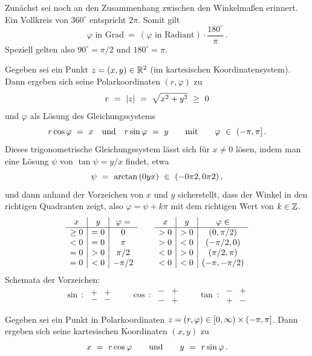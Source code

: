Zunächst sei noch an den Zusammenhang zwischen den Winkelmaßen erinnert. Ein
Vollkreis von $360^\circ$ entspricht $2\pi$. Somit gilt
\[
\text{$\varphi$ in Grad}
\ =\ (\text{$\varphi$ in Radiant})\cdot\frac{180^\circ}{\pi}
\,.
\]
Speziell gelten also $90^\circ=\pi/2$ und $180^\circ=\pi$.

\noindent Gegeben sei ein Punkt $z=(x,y)\in\mathbb{R}^2$ (im kartesischen Koordinatensystem). Dann ergeben sich seine Polarkoordinaten $(r,\varphi)$ zu
\[
r
\ =\ \lvert z\rvert
\ =\ \sqrt{x^2+y^2}
\ \ge\ 0
\]
und $\varphi$ als Lösung des Gleichungssystems
\[
r\cos\varphi
\ =\ x
\quad\text{und}\quad
r\sin\varphi
\ =\ y
\qquad\text{mit}\qquad
\varphi
\ \in\ ({-\pi},{\pi}]
\,.
\]
Dieses trigonometrische Gleichungssystem lässt sich für $x\neq0$ lösen, indem
man eine Lösung $\psi$ von $\tan\psi=y/x$ findet, etwa
\[
\psi
\ =\ \arctan\left(\frac{y}{x}\right)
\ \in\ \Ointerval{-\frac{\pi}2}{\frac{\pi}2}
,
\]
und dann anhand der Vorzeichen von $x$ und $y$ sicherstellt, dass der Winkel in den richtigen Quadranten zeigt, also $\varphi=\psi+k\pi$ mit dem richtigen Wert von $k\in\mathbb{Z}$.
\[
\begin{array}{c|c|c}
x & y & \varphi=\\
\hline
\ge0 & =0 & 0\\
<0 & =0 & \pi\\
=0 & >0 & \pi/2\\
=0 & <0 & -\pi/2
\end{array}
\qquad
\begin{array}{c|c|c}
x & y & \varphi\in\\
\hline
>0 & >0 & ({0},{\pi/2})\\
>0 & <0 & ({-\pi/2},{0})\\
<0 & >0 & ({\pi/2},{\pi})\\
<0 & <0 & ({-\pi},{-\pi/2})
\end{array}
\]
Schemata der Vorzeichen:
\[
\sin\,:\;
\begin{array}{c|c}
+&+\\\hline-&-
\end{array}
\qquad
\cos\,:\;
\begin{array}{c|c}
-&+\\\hline-&+
\end{array}
\qquad
\tan\,:\;
\begin{array}{c|c}
-&+\\\hline+&-
\end{array}
\]

\noindent Gegeben sei ein Punkt in Polarkoordinaten $z=(r,\varphi)\in[{0},{\infty})\times({-\pi},{\pi}]$. Dann ergeben sich seine kartesischen Koordinaten $(x,y)$ zu
\[
x
\ =\ r\cos\varphi
\qquad\text{und}\qquad
y
\ =\ r\sin\varphi
\,.
\]

